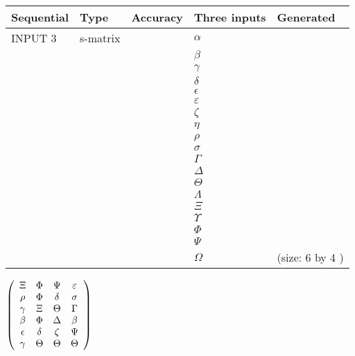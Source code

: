 \documentclass[12pt]{article}
\begin{document}
  
\noindent\begin{tabular}{|l|l|l|l|l|}
\hline
 Sequential & Type & Accuracy & Three inputs & Generated \\ 
\hline
 
 
  INPUT $  3 $ & s-matrix & & 
 $  \alpha $ & 
  \\
  & & & 
 $  \beta $ & 
  \\
  & & & 
 $  \gamma $ & 
  \\
  & & & 
 $  \delta $ & 
  \\
  & & & 
 $  \epsilon $ & 
  \\
  & & & 
 $  \varepsilon $ & 
  \\
  & & & 
 $                     \zeta $ & 
  \\
  & & & 
 $  \eta $ & 
  \\
  & & & 
 $  \rho $ & 
  \\
  & & & 
 $  \sigma $ & 
  \\
  & & & 
 $  \Gamma $ & 
  \\
  & & & 
 $  \Delta $ & 
  \\
  & & & 
 $  \Theta $ & 
  \\
  & & & 
 $  \Lambda $ & 
  \\
  & & & 
 $                     \Xi $ & 
  \\
  & & & 
 $  \Upsilon $ & 
  \\
  & & & 
 $  \Phi $ & 
  \\
  & & & 
 $  \Psi $ & 
  \\
  & & & 
 $  \Omega $ & 
  (size:  6  by  4 )
 \\  \hline  
 \end{tabular}
   
   
 $  \left( \begin{array}
 {
 c
 c
 c
 c
 }
                    \Xi & 
 \Phi & 
 \Psi & 
 \varepsilon \\ 
 \rho & 
 \Phi & 
 \delta & 
 \sigma \\ 
 \gamma & 
                    \Xi & 
 \Theta & 
 \Gamma \\ 
 \beta & 
 \Phi & 
 \Delta & 
 \beta \\ 
 \epsilon & 
 \delta & 
                    \zeta & 
 \Psi \\ 
 \gamma & 
 \Theta & 
 \Theta & 
 \Theta
 \end{array} \right) $ 
  
\end{document}

